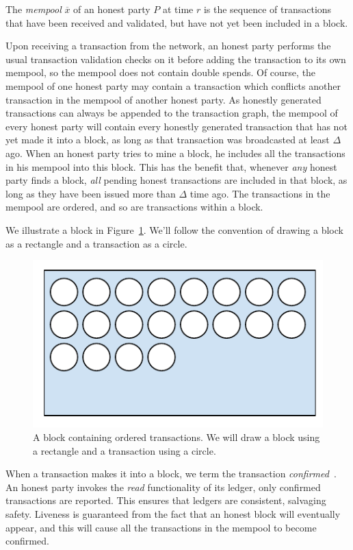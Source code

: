\begin{definition}[Mempool]
    The \emph{mempool} $\overline{x}$ of an honest party $P$ at time $r$ is the sequence of transactions
    that have been received and validated, but have not yet been included in a block.
\end{definition}

Upon receiving a transaction from the network, an honest party performs the usual transaction
validation checks on it before adding the transaction to its own mempool, so the mempool
does not contain double spends. Of course, the mempool of one honest party may contain a
transaction which conflicts another transaction in the mempool of another honest party.
As honestly generated transactions can always be appended to the transaction graph,
the mempool of every honest party will contain every honestly generated transaction
that has not yet made it into a block, as long as that transaction was broadcasted
at least $\Delta$ ago. When an honest party tries to mine a block,
he includes all the transactions in his mempool into this block. This has the benefit
that, whenever \emph{any} honest party finds a block, \emph{all} pending honest transactions
are included in that block, as long as they have been issued more than $\Delta$ time ago.
The transactions in the mempool are ordered, and so are transactions within a block.

We illustrate a block in Figure~\ref{fig.block}. We'll follow the convention of drawing
a block as a rectangle and a transaction as a circle.

\begin{figure}[h]
    \centering
    \includegraphics[width=0.5 \columnwidth,keepaspectratio]{figures/block.pdf}
    \caption{A block containing ordered transactions. We will draw a block using a rectangle
             and a transaction using a circle.}
    \label{fig.block}
\end{figure}

When a transaction makes it into a block, we term the transaction
\emph{confirmed}~. An honest party invokes the \emph{read} functionality
of its ledger, only confirmed transactions are reported. This ensures that ledgers
are consistent, salvaging safety. Liveness is guaranteed from the fact that an honest
block will eventually appear, and this will cause all the transactions in the mempool to
become confirmed.

